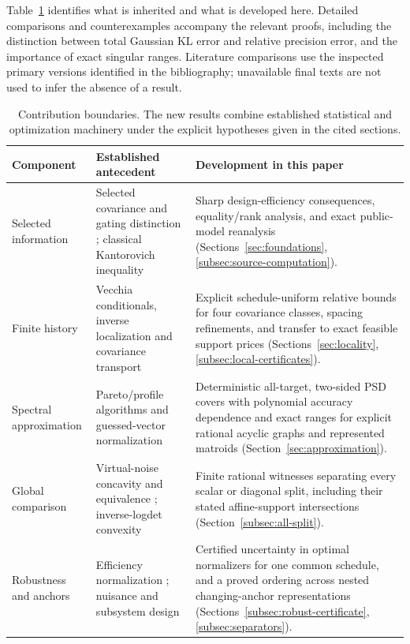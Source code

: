 Table~\ref{tab:prior-contributions} identifies what is inherited and what is
developed here. Detailed comparisons and counterexamples accompany the relevant
proofs, including the distinction between total Gaussian KL error and relative
precision error, and the importance of exact singular ranges. Literature
comparisons use the inspected primary versions identified in the bibliography;
unavailable final texts are not used to infer the absence of a result.

\begin{table}[htbp]
\centering\small
\caption{Contribution boundaries. The new results combine established
statistical and optimization machinery under the explicit hypotheses given
in the cited sections.}
\label{tab:prior-contributions}
\begin{tabular}{@{}>{\raggedright\arraybackslash}p{}>{\raggedright\arraybackslash}p{}>{\raggedright\arraybackslash}p{}@{}}
\toprule
Component & Established antecedent & Development in this paper\\
\midrule
Selected information & Selected covariance and gating distinction
\citep{Liu2016}; classical Kantorovich inequality \citep{Moradi2019}
& Sharp design-efficiency consequences, equality/rank analysis, and exact
public-model reanalysis (Sections~\ref{sec:foundations},
\ref{subsec:source-computation}).\\[4pt]
Finite history & Vecchia conditionals, inverse localization and covariance
transport \citep{Vecchia1988,Schafer2021,Kozdoba2019}
& Explicit schedule-uniform relative bounds for four covariance classes,
spacing refinements, and transfer to exact feasible support prices
(Sections~\ref{sec:locality}, \ref{subsec:local-certificates}).\\[4pt]
Spectral approximation & Pareto/profile algorithms and guessed-vector
normalization \citep{Berstein2008,Tsaggouris2009,Brown2024}
& Deterministic all-target, two-sided PSD covers with polynomial accuracy
dependence and exact ranges for explicit rational acyclic graphs and represented matroids
(Section~\ref{sec:approximation}).\\[4pt]
Global comparison & Virtual-noise concavity and equivalence
\citep{Liu2016,Pazman2022,Hainy2025}; inverse-logdet convexity
\citep{KimKim2006}
& Finite rational witnesses separating every scalar or diagonal split,
including their stated affine-support intersections
(Section~\ref{subsec:all-split}).\\[4pt]
Robustness and anchors & Efficiency normalization
\citep{Burclova2016,Maus2010}; nuisance and subsystem design
\citep{Alexanderian2021,Sagnol2015}
& Certified uncertainty in optimal normalizers for one common schedule, and a proved
ordering across nested changing-anchor representations
(Sections~\ref{subsec:robust-certificate}, \ref{subsec:separators}).\\
\bottomrule
\end{tabular}
\end{table}

